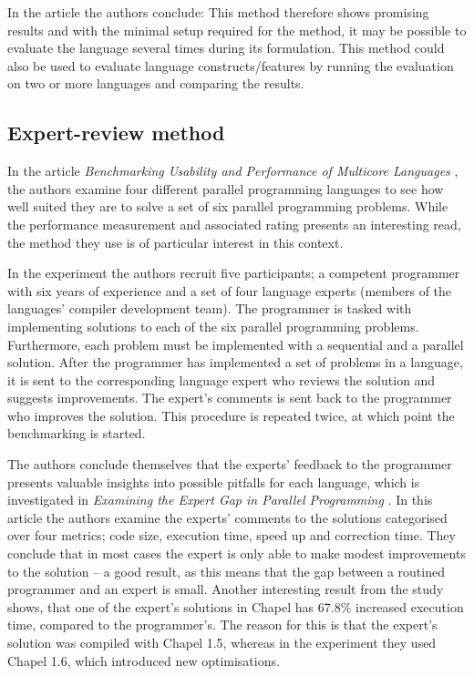 In the article the authors conclude:
This method therefore shows promising results and with the minimal setup required for the method, it may be possible to evaluate the language several times during its formulation.
This method could also be used to evaluate language constructs/features by running the evaluation on two or more languages and comparing the results.

\subsection{Expert-review method}
In the article \textit{Benchmarking Usability and Performance of
Multicore Languages} \cite{nanz2013benchmarking}, the authors examine four different parallel programming languages to see how well suited they are to solve a set of six parallel programming problems. While the performance measurement and associated rating presents an interesting read, the method they use is of particular interest in this context. 

In the experiment the authors recruit five participants; a competent programmer with six years of experience and a set of four language experts (members of the languages' compiler development team). The programmer is tasked with implementing solutions to each of the six parallel programming problems. Furthermore, each problem must be implemented with a sequential and a parallel solution. After the programmer has implemented a set of problems in a language, it is sent to the corresponding language expert who reviews the solution and suggests improvements. The expert's comments is sent back to the programmer who improves the solution. This procedure is repeated twice, at which point the benchmarking is started.

The authors conclude themselves that the experts' feedback to the programmer presents valuable insights into possible pitfalls for each language, which is investigated in \textit{Examining the Expert Gap in Parallel Programming} \cite{nanz2013examining}. In this article the authors examine the experts' comments to the solutions categorised over four metrics; code size, execution time, speed up and correction time. 
They conclude that in most cases the expert is only able to make modest improvements to the solution -- a good result, as this means that the gap between a routined programmer and an expert is small. Another interesting result from the study shows, that one of the expert's solutions in Chapel has 67.8\% increased execution time, compared to the programmer's. The reason for this is that the expert's solution was compiled with Chapel 1.5, whereas in the experiment they used Chapel 1.6, which introduced new optimisations. 

